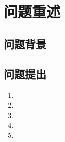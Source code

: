 \section{问题重述}
\subsection{问题背景}







\subsection{问题提出}
\begin{enumerate}
	\item 
	\item 
	\item 
	\item 
	\item
\end{enumerate}